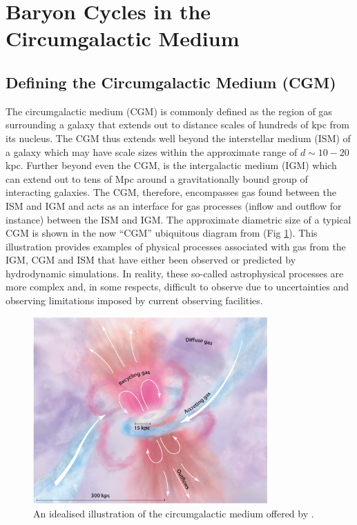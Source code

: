\section{Baryon Cycles in the Circumgalactic Medium}
\subsection{Defining the Circumgalactic Medium (CGM)} 
The circumgalactic medium (CGM) is commonly defined as the region of gas surrounding a galaxy that extends out to distance scales of hundreds of kpc from its nucleus. The CGM thus extends well beyond the interstellar medium (ISM) of a galaxy which may have scale sizes within the approximate range of $d \sim10-20$ kpc.  Further beyond even the CGM, is the intergalactic medium (IGM) which can extend out to tens of Mpc around a gravitationally bound group of interacting galaxies. The CGM, therefore, encompasses gas found between the ISM and IGM and acts as an interface for gas processes (inflow and outflow for instance) between the ISM and IGM. The approximate diametric size of a typical CGM is shown in the now ``CGM'' ubiquitous diagram from \citet{tumlinson2017} (Fig \ref{fig:CGM-Tumlinson2017}). This illustration provides examples of physical processes associated with gas from the IGM, CGM and ISM that have either been observed or predicted by hydrodynamic simulations. In reality, these so-called astrophysical processes are more complex and, in some respects, difficult to observe due to uncertainties and observing limitations imposed by current observing facilities. 

\begin{figure}[!ht]
 \centering
 \includegraphics[width=0.8\textwidth]{plots_chp1/CGM_Tumlinson_2017.png}
 \caption[A general view of a galaxy's circumgalactic medium (CGM)]{An idealised illustration of the circumgalactic medium offered by \citet{tumlinson2017}.}
 \label{fig:CGM-Tumlinson2017}
\end{figure}

